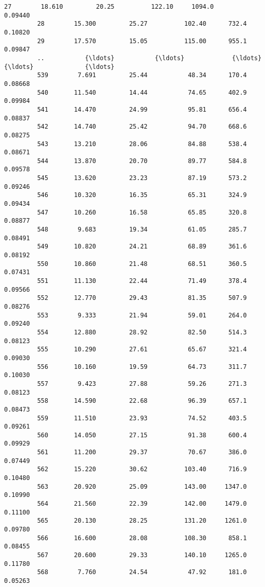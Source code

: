 \documentclass[11pt]{article}
\begin{document}
\begin{Verbatim}[commandchars=\\\{\}]
         27        18.610         20.25          122.10     1094.0          0.09440   
         28        15.300         25.27          102.40      732.4          0.10820   
         29        17.570         15.05          115.00      955.1          0.09847   
         ..           {\ldots}           {\ldots}             {\ldots}        {\ldots}              {\ldots}   
         539        7.691         25.44           48.34      170.4          0.08668   
         540       11.540         14.44           74.65      402.9          0.09984   
         541       14.470         24.99           95.81      656.4          0.08837   
         542       14.740         25.42           94.70      668.6          0.08275   
         543       13.210         28.06           84.88      538.4          0.08671   
         544       13.870         20.70           89.77      584.8          0.09578   
         545       13.620         23.23           87.19      573.2          0.09246   
         546       10.320         16.35           65.31      324.9          0.09434   
         547       10.260         16.58           65.85      320.8          0.08877   
         548        9.683         19.34           61.05      285.7          0.08491   
         549       10.820         24.21           68.89      361.6          0.08192   
         550       10.860         21.48           68.51      360.5          0.07431   
         551       11.130         22.44           71.49      378.4          0.09566   
         552       12.770         29.43           81.35      507.9          0.08276   
         553        9.333         21.94           59.01      264.0          0.09240   
         554       12.880         28.92           82.50      514.3          0.08123   
         555       10.290         27.61           65.67      321.4          0.09030   
         556       10.160         19.59           64.73      311.7          0.10030   
         557        9.423         27.88           59.26      271.3          0.08123   
         558       14.590         22.68           96.39      657.1          0.08473   
         559       11.510         23.93           74.52      403.5          0.09261   
         560       14.050         27.15           91.38      600.4          0.09929   
         561       11.200         29.37           70.67      386.0          0.07449   
         562       15.220         30.62          103.40      716.9          0.10480   
         563       20.920         25.09          143.00     1347.0          0.10990   
         564       21.560         22.39          142.00     1479.0          0.11100   
         565       20.130         28.25          131.20     1261.0          0.09780   
         566       16.600         28.08          108.30      858.1          0.08455   
         567       20.600         29.33          140.10     1265.0          0.11780   
         568        7.760         24.54           47.92      181.0          0.05263   
         

\end{Verbatim}
\end{document}
